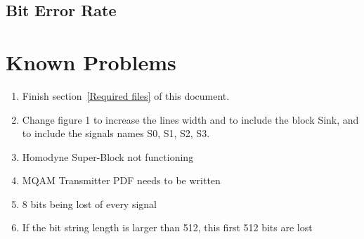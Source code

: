 \documentclass[a4paper]{article}
\begin{document}
\subsection{Bit Error Rate}


\section{Known Problems}
\begin{enumerate}
    \item{Finish section~\ref{Required files} of this document.}
    \item{Change figure 1 to increase the lines width and to include the block Sink, and to include the signals names S0, S1, S2, S3.}
    \item Homodyne Super-Block not functioning
    \item MQAM Transmitter PDF needs to be written
    \item 8 bits being lost of every signal
    \item If the bit string length is larger than 512, this first 512 bits are lost
\end{enumerate}
\end{document}

